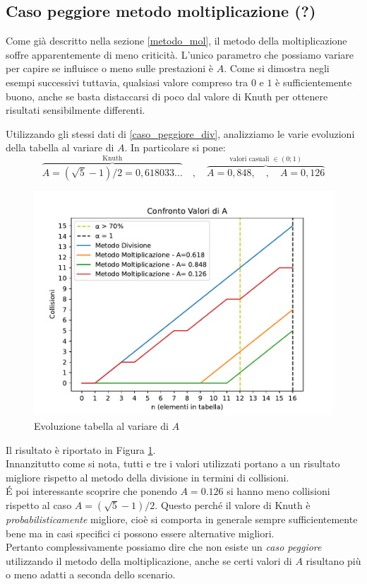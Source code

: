 \subsection{Caso peggiore metodo moltiplicazione (?)} \label{worst_case_mol}
Come già descritto nella sezione \ref{metodo_mol}, il metodo della moltiplicazione soffre apparentemente di meno criticità. L'unico parametro che possiamo variare per capire se influisce o meno sulle prestazioni è $A$. Come si dimostra negli esempi successivi tuttavia, qualsiasi valore compreso tra $0$ e $1$ è sufficientemente buono, anche se basta distaccarsi di poco dal valore di Knuth per ottenere risultati sensibilmente differenti.


Utilizzando gli stessi dati di \ref{caso_peggiore_div}, analizziamo le varie evoluzioni della tabella al variare di $A$. In particolare si pone:
\[
\overbrace{A=(\sqrt{5}-1)/2 = 0,618033...}^{\text{Knuth}} \quad , \quad \overbrace{A=0,848, \quad , \quad A=0,126}^{\text{valori casuali } \in (0;1)}
\]

\begin{figure}[h]
    \begin{center}
    \includegraphics[scale=0.65]{src/img/worstcase_mul.pdf}
    \caption{Evoluzione tabella al variare di $A$}
     \label{fig:worstcase_mul}
    \end{center}
\end{figure}
Il risultato è riportato in Figura \ref{fig:worstcase_mul}. \\ 
Innanzitutto come si nota, tutti e tre i valori utilizzati portano a un risultato migliore rispetto al metodo della divisione in termini di collisioni. \\ 
\'E poi interessante scoprire che ponendo $A = 0.126$ si hanno meno collisioni rispetto al caso $A=(\sqrt{5}-1)/2$. Questo perché il valore di Knuth è \emph{probabilisticamente} migliore, cioè si comporta in generale sempre sufficientemente bene ma in casi specifici ci possono essere alternative migliori. \\
Pertanto complessivamente possiamo dire che non esiste un \emph{caso peggiore} utilizzando il metodo della moltiplicazione, anche se certi valori di $A$ risultano più o meno adatti a seconda dello scenario.